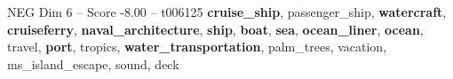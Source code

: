 \begin{textsample}{NEG Dim 6 – Score -8.00 – t006125}  \label{ex:f6_neg_027}
\textbf{cruise\_ship}, passenger\_ship, \textbf{watercraft}, \textbf{cruiseferry}, \textbf{naval\_architecture}, \textbf{ship}, \textbf{boat}, \textbf{sea}, \textbf{ocean\_liner}, \textbf{ocean}, travel, \textbf{port}, tropics, \textbf{water\_transportation}, palm\_trees, vacation, ms\_island\_escape, sound, deck

\end{textsample}
